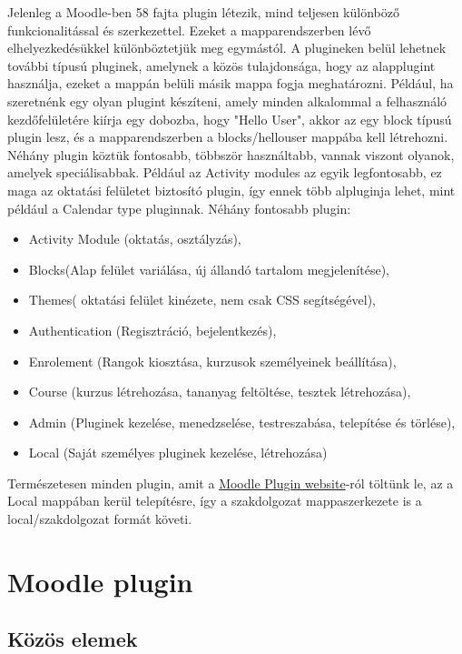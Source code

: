 Jelenleg a Moodle-ben 58 fajta plugin létezik, mind teljesen különböző funkcionalitással és szerkezettel. Ezeket a mapparendszerben lévő elhelyezkedésükkel különböztetjük meg egymástól. A plugineken belül lehetnek további típusú pluginek, amelynek a közös tulajdonsága, hogy az alapplugint használja, ezeket a mappán belüli másik mappa fogja meghatározni. Például, ha szeretnénk egy olyan plugint készíteni, amely minden alkalommal a felhasználó kezdőfelületére kiírja egy dobozba, hogy "Hello User", akkor az egy block típusú plugin lesz, és a mapparendszerben a blocks/hellouser mappába kell létrehozni. Néhány plugin köztük fontosabb, többször használtabb, vannak viszont olyanok, amelyek speciálisabbak. Például az Activity modules az egyik legfontosabb, ez maga az oktatási felületet biztosító plugin, így ennek több alpluginja lehet, mint például a Calendar type pluginnak. Néhány fontosabb plugin: 
\begin{itemize}
    \item Activity Module (oktatás, osztályzás), 
    \item Blocks(Alap felület variálása, új állandó tartalom megjelenítése), 
    \item Themes( oktatási felület kinézete, nem csak CSS segítségével), 
    \item Authentication (Regisztráció, bejelentkezés), 
    \item Enrolement (Rangok kiosztása, kurzusok személyeinek beállítása), 
    \item Course (kurzus létrehozása, tananyag feltöltése, tesztek létrehozása), 
    \item Admin (Pluginek kezelése, menedzselése, testreszabása, telepítése és törlése), 
    \item Local (Saját személyes pluginek kezelése, létrehozása) 
\end{itemize}

Természetesen minden plugin, amit a \href{https://moodle.org/plugins/}{Moodle Plugin website}-ról töltünk le, az a Local mappában kerül telepítésre, így a szakdolgozat mappaszerkezete is a local/szakdolgozat formát követi.

\section{Moodle plugin}

\subsection{Közös elemek}

